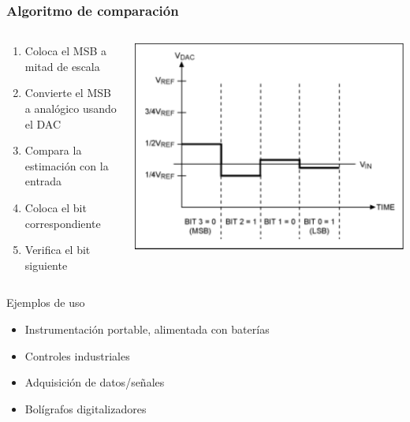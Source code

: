 \documentclass{beamer}
\begin{document}
\begin{frame}
\frametitle{Algoritmo de comparación}
\begin{columns}
    \begin{column}{0.65\textwidth}
      \begin{exampleblock}{}
        \begin{enumerate}
          \item Coloca el MSB a mitad de escala 
          \item Convierte el MSB a analógico usando el DAC 
          \item Compara la estimación con la entrada 
          \item Coloca el bit correspondiente
          \item Verifica el bit siguiente
        \end{enumerate}
      \end{exampleblock}
    \end{column} 
    \begin{column}{0.35\textwidth}
      \includegraphics[width=\textwidth]{d3/sar_adc}
    \end{column} 
  \end{columns}
      \begin{exampleblock}{Ejemplos de uso}
        \begin{itemize}
          \item  Instrumentación portable, alimentada con baterías
          \item  Controles industriales
          \item  Adquisición de datos/señales
          \item  Bolígrafos digitalizadores 
        \end{itemize}
      \end{exampleblock}
\end{frame}
\end{document}
